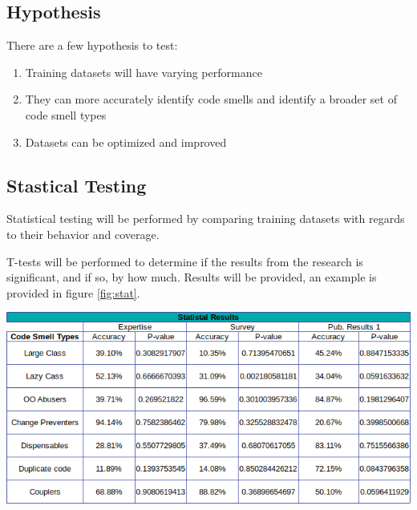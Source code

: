 \documentclass[conference]{IEEEtran}
\begin{document}
\subsection{Hypothesis}
There are a few hypothesis to test:
\begin{enumerate}

\item Training datasets will have varying performance
\item They can more accurately identify code smells and identify a broader set of code smell types
\item Datasets can be optimized and improved

\end{enumerate}
\subsection{Stastical Testing}
Statistical testing will be performed by comparing training datasets with regards to their behavior and coverage.

T-tests will be performed to determine if the results from the research is significant, and if so, by how much. Results will be provided, an example is provided in figure \ref{fig:stat}.
\begin{center}
\includegraphics[width=\columnwidth]{statistics.png}
\label{fig:stat}%
\end{center}
\end{document}
